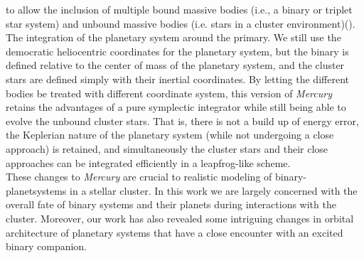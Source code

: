\documentclass[manuscript]{aastex631}
\begin{document}
to allow the inclusion of multiple bound massive bodies (i.e., a binary or triplet star system) and unbound massive bodies (i.e. stars in a cluster environment)(\cite{kai17}).
The integration of the planetary system around the primary. We still use the democratic heliocentric coordinates for the planetary system, but the binary
is defined relative to the center of mass of the planetary system, and the cluster stars are defined simply with their inertial coordinates. By letting the different
bodies be treated with different coordinate system, this version of \textit{Mercury} retains the advantages of a pure symplectic integrator while still being able 
to evolve the unbound cluster stars. That is, there is not a build up of energy error, the Keplerian nature of the planetary system (while not undergoing a close approach)
is retained, and simultaneously the cluster stars and their close approaches can be integrated efficiently in a leapfrog-like scheme. \\
\indent These changes to \textit{Mercury} are crucial to realistic modeling of binary-planetsystems in a stellar cluster.
 In this work we are largely concerned with the overall fate of binary systems and their planets during interactions with the cluster. Moreover, our
work has also revealed some intriguing changes in orbital architecture of planetary systems that have a close encounter with an excited binary companion.\\
\end{document}
